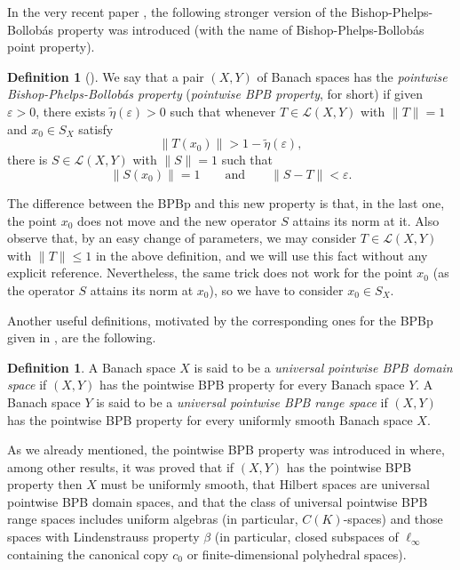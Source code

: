 \documentclass[a4paper,10pt]{amsart}
\theoremstyle{plain}
\theoremstyle{definition}
\newtheorem{definition}[theorem]{Definition}
\newcommand{\eps}{\varepsilon}
\renewcommand{\leq}{\leqslant}
\begin{document}
In the very recent paper \cite{DKL}, the following stronger version of the Bishop-Phelps-Bollob\'{a}s property was introduced (with the name of Bishop-Phelps-Bollob\'as point property).

\begin{definition}[\textrm{\cite[Definition 1.2]{DKL}}] We say that a pair $(X, Y)$ of Banach spaces has the \emph{pointwise Bishop-Phelps-Bollob\'as property} (\emph{pointwise BPB property}, for short) if given $\eps > 0$, there exists $\tilde\eta(\eps) > 0$ such that whenever $T \in \mathcal{L}(X, Y)$ with $\|T\| = 1$ and $x_0 \in S_X$ satisfy
	\begin{equation*}
	\|T(x_0)\| > 1 - \tilde\eta(\eps),	
	\end{equation*}
there is $S \in \mathcal{L}(X, Y)$ with $\|S\| = 1$ such that
\begin{equation*}
\|S(x_0)\| = 1 \qquad \text{and} \qquad \|S - T\| < \eps.	
\end{equation*}
\end{definition}

The difference between the BPBp and this new property is that, in the last one, the point $x_0$ does not move and the new operator $S$ attains its norm at it. Also observe that, by an easy change of parameters, we may consider $T \in \mathcal{L}(X, Y)$ with $\|T\| \leq 1$ in the above definition, and we will use this fact without any explicit reference. Nevertheless, the same trick does not work for the point $x_0$ (as the operator $S$ attains its norm at $x_0$), so we have to consider $x_0\in S_X$.


Another useful definitions, motivated by the corresponding ones for the BPBp given in \cite{ACKLM}, are the following.

\begin{definition}
A Banach space $X$ is said to be a \emph{universal pointwise BPB domain space} if $(X, Y)$ has the pointwise BPB property for every Banach space $Y$. A Banach space $Y$ is said to be a \emph{universal pointwise BPB range space} if $(X, Y)$ has the pointwise BPB property for every uniformly smooth Banach space $X$.
\end{definition}


As we already mentioned, the pointwise BPB property was introduced in \cite{DKL} where, among other results, it was proved that if $(X, Y)$ has the pointwise BPB property then $X$ must be uniformly smooth, that Hilbert spaces are universal pointwise BPB domain spaces, and that the class of universal pointwise BPB range spaces includes uniform algebras (in particular, $C(K)$-spaces) and those spaces with Lindenstrauss property $\beta$ (in particular, closed subspaces of $\ell_\infty$ containing the canonical copy $c_0$ or finite-dimensional polyhedral spaces).
\end{document}
